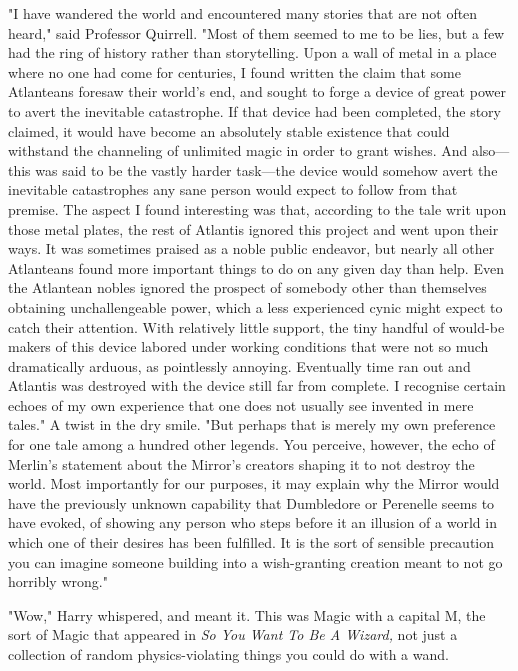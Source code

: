 "I have wandered the world and encountered many stories that are not often
heard," said Professor Quirrell. "Most of them seemed to me to be lies, but a
few had the ring of history rather than storytelling. Upon a wall of metal in a
place where no one had come for centuries, I found written the claim that some
Atlanteans foresaw their world's end, and sought to forge a device of great
power to avert the inevitable catastrophe. If that device had been completed,
the story claimed, it would have become an absolutely stable existence that
could withstand the channeling of unlimited magic in order to grant wishes. And
also---this was said to be the vastly harder task---the device would somehow
avert the inevitable catastrophes any sane person would expect to follow from
that premise. The aspect I found interesting was that, according to the tale
writ upon those metal plates, the rest of Atlantis ignored this project and
went upon their ways. It was sometimes praised as a noble public endeavor, but
nearly all other Atlanteans found more important things to do on any given day
than help. Even the Atlantean nobles ignored the prospect of somebody other
than themselves obtaining unchallengeable power, which a less experienced cynic
might expect to catch their attention. With relatively little support, the tiny
handful of would-be makers of this device labored under working conditions that
were not so much dramatically arduous, as pointlessly annoying. Eventually time
ran out and Atlantis was destroyed with the device still far from complete. I
recognise certain echoes of my own experience that one does not usually see
invented in mere tales." A twist in the dry smile. "But perhaps that is merely
my own preference for one tale among a hundred other legends. You perceive,
however, the echo of Merlin's statement about the Mirror's creators shaping it
to not destroy the world. Most importantly for our purposes, it may explain why
the Mirror would have the previously unknown capability that Dumbledore or
Perenelle seems to have evoked, of showing any person who steps before it an
illusion of a world in which one of their desires has been fulfilled. It is the
sort of sensible precaution you can imagine someone building into a
wish-granting creation meant to not go horribly wrong."

"Wow," Harry whispered, and meant it. This was Magic with a capital M, the sort
of Magic that appeared in \emph{So You Want To Be A Wizard,} not just a
collection of random physics-violating things you could do with a wand.

